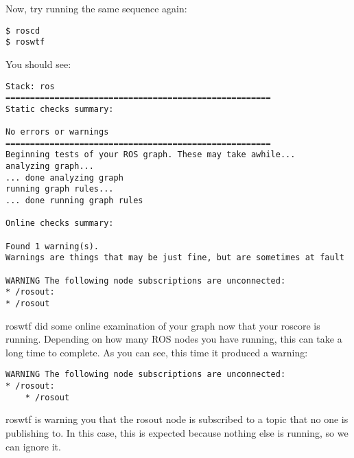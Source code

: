 Now, try running the same sequence again:

\begin{lstlisting}[breaklines=true languages=bash]
$ roscd
$ roswtf
\end{lstlisting}

You should see:
\begin{lstlisting}[breaklines=true languages=bash]
Stack: ros
======================================================
Static checks summary:

No errors or warnings
======================================================
Beginning tests of your ROS graph. These may take awhile...
analyzing graph...
... done analyzing graph
running graph rules...
... done running graph rules

Online checks summary:

Found 1 warning(s).
Warnings are things that may be just fine, but are sometimes at fault

WARNING The following node subscriptions are unconnected:
* /rosout:
* /rosout
\end{lstlisting}

roswtf did some online examination of your graph now that your roscore is running. Depending on how many ROS nodes you have running, this can take a long time to complete. As you can see, this time it produced a warning:

\begin{lstlisting}[breaklines=true languages=bash]
WARNING The following node subscriptions are unconnected:
* /rosout:
	* /rosout
\end{lstlisting}

roswtf is warning you that the rosout node is subscribed to a topic that no one is publishing to. In this case, this is expected because nothing else is running, so we can ignore it.